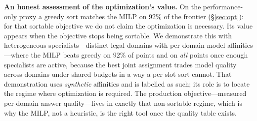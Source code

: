 \documentclass[11pt]{article}
\begin{document}
\textbf{An honest assessment of the optimization's value.} On the
performance-only proxy a greedy sort matches the MILP on $92\%$ of the frontier
(§\ref{sec:opt}): for that sortable objective we do not claim the optimization is
necessary. Its value appears when the objective stops being sortable. We
demonstrate this with heterogeneous specialists---distinct legal domains with
per-domain model affinities---where the MILP beats greedy on $92\%$ of points and
on \emph{all} points once enough specialists are active, because the best joint
assignment trades model quality across domains under shared budgets in a way a
per-slot sort cannot. That demonstration uses \emph{synthetic} affinities and is
labelled as such; its role is to locate the regime where optimization is
required. The production objective---measured per-domain answer quality---lives
in exactly that non-sortable regime, which is why the MILP, not a heuristic, is
the right tool once the quality table exists.
\end{document}
